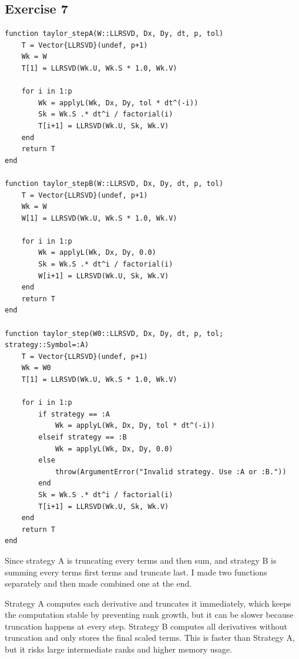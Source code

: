\documentclass[11pt]{article}
\begin{document}
\subsection*{Exercise 7}
\begin{lstlisting}
function taylor_stepA(W::LLRSVD, Dx, Dy, dt, p, tol)
    T = Vector{LLRSVD}(undef, p+1)
    Wk = W
    T[1] = LLRSVD(Wk.U, Wk.S * 1.0, Wk.V)

    for i in 1:p
        Wk = applyL(Wk, Dx, Dy, tol * dt^(-i))
        Sk = Wk.S .* dt^i / factorial(i)
        T[i+1] = LLRSVD(Wk.U, Sk, Wk.V)
    end
    return T
end

function taylor_stepB(W::LLRSVD, Dx, Dy, dt, p, tol)
    T = Vector{LLRSVD}(undef, p+1)
    Wk = W
    W[1] = LLRSVD(Wk.U, Wk.S * 1.0, Wk.V)

    for i in 1:p
        Wk = applyL(Wk, Dx, Dy, 0.0)
        Sk = Wk.S .* dt^i / factorial(i)
        W[i+1] = LLRSVD(Wk.U, Sk, Wk.V)
    end
    return T
end

function taylor_step(W0::LLRSVD, Dx, Dy, dt, p, tol; strategy::Symbol=:A)
    T = Vector{LLRSVD}(undef, p+1)
    Wk = W0
    T[1] = LLRSVD(Wk.U, Wk.S * 1.0, Wk.V)

    for i in 1:p
        if strategy == :A
            Wk = applyL(Wk, Dx, Dy, tol * dt^(-i))
        elseif strategy == :B
            Wk = applyL(Wk, Dx, Dy, 0.0)
        else
            throw(ArgumentError("Invalid strategy. Use :A or :B."))
        end
        Sk = Wk.S .* dt^i / factorial(i)
        T[i+1] = LLRSVD(Wk.U, Sk, Wk.V)
    end
    return T
end

\end{lstlisting}

Since strategy A is truncating every terms and then sum, and strategy B is summing every terms first terms and truncate last. I made two functions separately and then made combined one at the end. 

\vspace{0.8em}

Strategy A computes each derivative and truncates it immediately, which keeps the computation stable by preventing rank growth, but it can be slower because truncation happens at every step.
Strategy B computes all derivatives without truncation and only stores the final scaled terms. This is faster than Strategy A, but it risks large intermediate ranks and higher memory usage.
\end{document}
